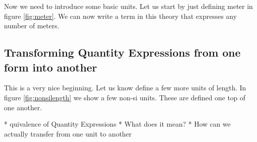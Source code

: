 Now we need to introduce some basic units. Let us start by just defining meter in figure \ref{fig:meter}. We can now write a term in this theory that expresses any number of meters.



\subsection{Transforming Quantity Expressions from one form into another}

This is a very nice beginning. Let us know define a few more units of length. In figure \ref{fig:nonsilength} we show a few non-si units. These are defined one top of one another.




* quivalence of Quantity Expressions
* What does it mean?
* How can we actually transfer from one unit to another
